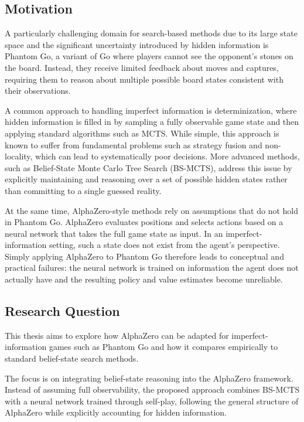 \documentclass[12pt,oneside,openright]{article}
\begin{document}
\subsection{Motivation}

A particularly challenging domain for search-based methods due to its large state space and the significant uncertainty introduced by hidden information is Phantom Go, a variant of Go where players cannot see the opponent's stones on the board. Instead, they receive limited feedback about moves and captures, requiring them to reason about multiple possible board states consistent with their observations.

A common approach to handling imperfect information is determinization, where hidden information is filled in by sampling a fully observable game state and then applying standard algorithms such as MCTS.
While simple, this approach is known to suffer from fundamental problems such as strategy fusion and non-locality, which can lead to systematically poor decisions.
More advanced methods, such as Belief-State Monte Carlo Tree Search (BS-MCTS), address this issue by explicitly maintaining and reasoning over a set of possible hidden states rather than committing to a single guessed reality\cite{Wang2015bsmcts}.

At the same time, AlphaZero-style methods rely on assumptions that do not hold in Phantom Go.
AlphaZero evaluates positions and selects actions based on a neural network that takes the full game state as input. In an imperfect-information setting, such a state does not exist from the agent's perspective. Simply applying AlphaZero to Phantom Go therefore leads to conceptual and practical failures:
the neural network is trained on information the agent does not actually have and the resulting policy and value estimates become unreliable.

\subsection{Research Question}

This thesis aims to explore how AlphaZero can be adapted for imperfect-information games such as Phantom Go and how it compares empirically to standard belief-state search methods.

The focus is on integrating belief-state reasoning into the AlphaZero framework.
Instead of assuming full observability, the proposed approach combines BS-MCTS with a neural network trained through self-play, following the general structure of AlphaZero while explicitly accounting for hidden information.
\end{document}
